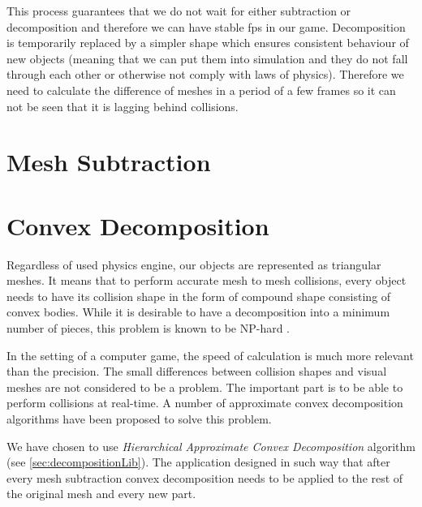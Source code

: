 This process guarantees that we do not wait for either subtraction or decomposition and therefore we can have stable fps in our game. Decomposition is temporarily replaced by a simpler shape which ensures consistent behaviour of new objects (meaning that we can put them into simulation and they do not fall through each other or otherwise not comply with laws of physics). Therefore we need to calculate the difference of meshes in a period of a few frames so it can not be seen that it is lagging behind collisions.


\section{Mesh Subtraction}
\label{sec:subtraction}

\section{Convex Decomposition}
\label{sec:decomposition}
Regardless of used physics engine, our objects are represented as triangular meshes. It means that to perform accurate mesh to mesh collisions, every object needs to have its collision shape in the form of compound shape consisting of convex bodies. While it is desirable to have a decomposition into a minimum number of pieces, this problem is known to be NP-hard \cite{convexDecomp}. 

In the setting of a computer game, the speed of calculation is much more relevant than the precision. The small differences between collision shapes and visual meshes are not considered to be a problem. The important part is to be able to perform collisions at real-time. A number of approximate convex decomposition algorithms have been proposed to solve this problem.

We have chosen to use \emph{Hierarchical Approximate Convex Decomposition} algorithm (see \cref{sec:decompositionLib}). The application designed in such way that after every mesh subtraction convex decomposition needs to be applied to the rest of the original mesh and every new part.




